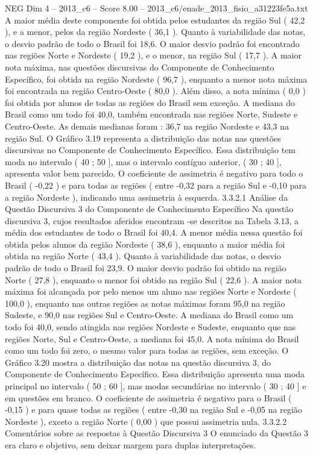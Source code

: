\begin{textsample}{NEG Dim 4 – 2013\_c6 – Score 8.00 – 2013\_c6/enade\_2013\_fisio\_a31223fe5a.txt}
A maior média deste componente foi obtida pelos estudantes da região Sul ( 42,2 ), e a menor, pelos da região Nordeste ( 36,1 ).
Quanto à variabilidade das notas, o desvio padrão de todo o Brasil foi 18,6.
O maior desvio padrão foi encontrado nas regiões Norte e Nordeste ( 19,2 ), e o menor, na região Sul ( 17,7 ).
A maior nota máxima, nas questões discursivas do Componente de Conhecimento Específico, foi obtida na região Nordeste ( 96,7 ), enquanto a menor nota máxima foi encontrada na região Centro-Oeste ( 80,0 ).
Além disso, a nota mínima ( 0,0 ) foi obtida por alunos de todas as regiões do Brasil sem exceção.
A mediana do Brasil como um todo foi 40,0, também encontrada nas regiões Norte, Sudeste e Centro-Oeste.
As demais medianas foram : 36,7 na região Nordeste e 43,3 na região Sul.
O Gráfico 3.19 representa a distribuição das notas nas questões discursivas no Componente de Conhecimento Específico.
Essa distribuição tem moda no intervalo ( 40 ; 50 ], mas o intervalo contíguo anterior, ( 30 ; 40 ], apresenta valor bem parecido.
O coeficiente de assimetria é negativo para todo o Brasil ( -0,22 ) e para todas as regiões ( entre -0,32 para a região Sul e -0,10 para a região Nordeste ), indicando uma assimetria à esquerda. 3.3.2.1 Análise da Questão Discursiva 3 do Componente de Conhecimento Específico Na questão discursiva 3, cujos resultados aferidos encontram -se descritos na Tabela 3.13, a média dos estudantes de todo o Brasil foi 40,4.
A menor média nessa questão foi obtida pelos alunos da região Nordeste ( 38,6 ), enquanto a maior média foi obtida na região Norte ( 43,4 ).
Quanto à variabilidade das notas, o desvio padrão de todo o Brasil foi 23,9.
O maior desvio padrão foi obtido na região Norte ( 27,8 ), enquanto o menor foi obtido na região Sul ( 22,6 ).
A maior nota máxima foi alcançada por pelo menos um aluno nas regiões Norte e Nordeste ( 100,0 ), enquanto nas outras regiões as notas máximas foram 95,0 na região Sudeste, e 90,0 nas regiões Sul e Centro-Oeste.
A mediana do Brasil como um todo foi 40,0, sendo atingida nas regiões Nordeste e Sudeste, enquanto que nas regiões Norte, Sul e Centro-Oeste, a mediana foi 45,0.
A nota mínima do Brasil como um todo foi zero, o mesmo valor para todas as regiões, sem exceção.
O Gráfico 3.20 mostra a distribuição das notas na questão discursiva 3, do Componente de Conhecimento Específico.
Essa distribuição apresenta uma moda principal no intervalo ( 50 ; 60 ], mas modas secundárias no intervalo ( 30 ; 40 ] e em questões em branco.
O coeficiente de assimetria é negativo para o Brasil ( -0,15 ) e para quase todas as regiões ( entre -0,30 na região Sul e -0,05 na região Nordeste ), exceto a região Norte ( 0,00 ) que possui assimetria nula. 3.3.2.2 Comentários sobre as respostas à Questão Discursiva 3 O enunciado da Questão 3 era claro e objetivo, sem deixar margem para duplas interpretações.

\end{textsample}
